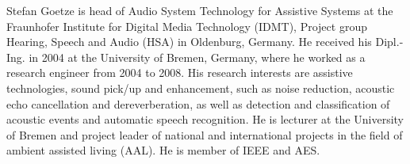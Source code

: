 \documentclass[10pt]{IEEEtran}
\begin{document}
\begin{IEEEbiography}{Stefan Goetze}
is head of Audio System Technology for Assistive Systems at the Fraunhofer Institute for Digital Media Technology (IDMT), Project group Hearing, Speech and Audio (HSA) in Oldenburg, Germany.
He received his Dipl.-Ing. in 2004 at the University of Bremen, Germany, where he worked as a research engineer from 2004 to 2008.
His research interests are assistive technologies, sound pick/up and enhancement, such as noise reduction, acoustic echo cancellation and dereverberation, as well as detection and classification of acoustic events and automatic speech recognition.
He is lecturer at the University of Bremen and project leader of national and international projects in the field of ambient assisted living (AAL).
He is member of IEEE and AES.
\vspace{-1cm}
\end{IEEEbiography}
\end{document}
